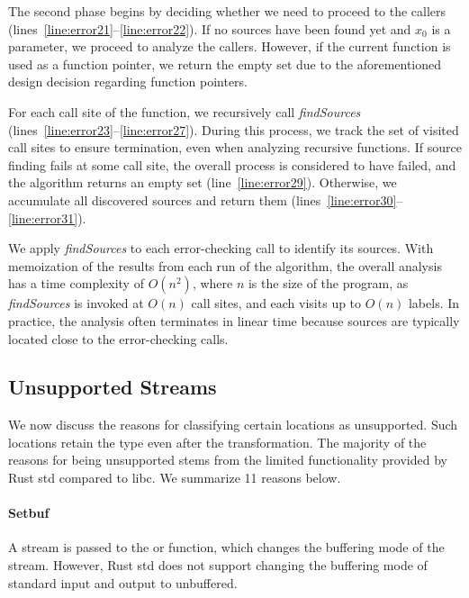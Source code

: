 The second phase begins by deciding whether we need to proceed to the callers
(lines~\ref{line:error21}--\ref{line:error22}).
%
If no sources have been found yet and $x_0$ is a parameter, we proceed to
analyze the callers.
%
However, if the current function is used as a function pointer, we return the
empty set due to the aforementioned design decision regarding function pointers.

For each call site of the function, we recursively call \textit{findSources}
(lines~\ref{line:error23}--\ref{line:error27}).
%
During this process, we track the set of visited call sites to ensure
termination, even when analyzing recursive functions.
%
If source finding fails at some call site, the overall process is considered to
have failed, and the algorithm returns an empty set
(line~\ref{line:error29}).
%
Otherwise, we accumulate all discovered sources and return them
(lines~\ref{line:error30}--\ref{line:error31}).

We apply \textit{findSources} to each error-checking call to identify its
sources.
%
With memoization of the results from each run of the algorithm, the overall
analysis has a time complexity of $O(n^2)$, where $n$ is the size of the
program, as \textit{findSources} is invoked at $O(n)$ call sites, and each
visits up to $O(n)$ labels.
%
In practice, the analysis often terminates in linear time because sources are
typically located close to the error-checking calls.

\subsection{Unsupported Streams}
\label{sec:analysis:unsupported}

We now discuss the reasons for classifying certain locations as unsupported.
%
Such locations retain the  type even after the transformation.
%
The majority of the reasons for being unsupported stems from the limited
functionality provided by Rust std compared to libc.
%
We summarize 11 reasons below.

\paragraph{Setbuf}

A stream is passed to the  or  function, which changes the
buffering mode of the stream.
%
However, Rust std does not support changing the buffering mode of standard input
and output to unbuffered.

